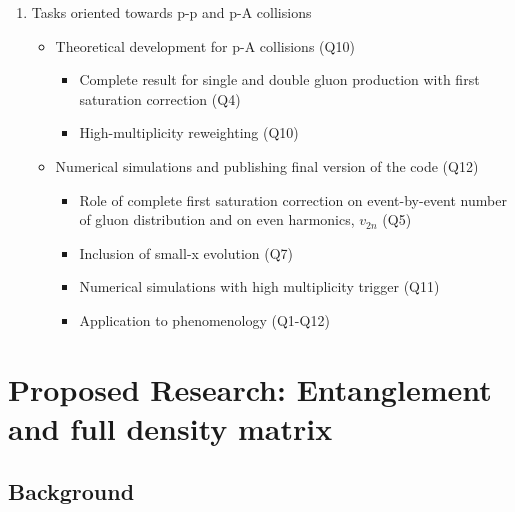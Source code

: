         \begin{enumerate}
            \item  Tasks oriented towards p-p 
				and  p-A  collisions  
                \begin{itemize}
                    \item Theoretical development for p-A collisions (Q10)
                        \begin{itemize}
                            \item Complete result for single and double 
								gluon production with first saturation 
								correction (Q4)
                            \item High-multiplicity reweighting  (Q10)
                        \end{itemize}
                    \item Numerical simulations and publishing  final version 
					of the 	code (Q12)
                        \begin{itemize}
                            \item Role of complete first saturation correction on 
								event-by-event number of gluon distribution 
								and on even harmonics, $v_{2n}$ (Q5)
                            \item Inclusion of small-x evolution  (Q7)
                            \item Numerical simulations with
								high multiplicity trigger (Q11)
							\item Application to phenomenology (Q1-Q12)
                        \end{itemize}
                \end{itemize}
        \end{enumerate}

\section{Proposed Research: Entanglement and full density matrix}
    \label{sec:p2}

    \vspace{0.5em}
    \subsection{Background}
    \label{sec:p2b}

